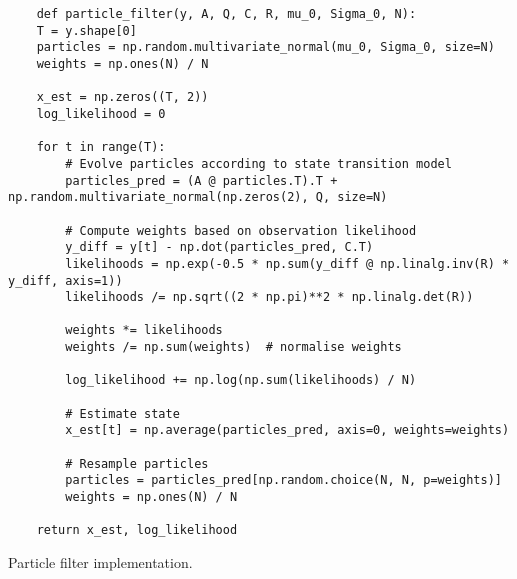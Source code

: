 \documentclass[12pt]{article}
\begin{document}
\begin{listing}
\begin{verbatim}
    def particle_filter(y, A, Q, C, R, mu_0, Sigma_0, N):
    T = y.shape[0]
    particles = np.random.multivariate_normal(mu_0, Sigma_0, size=N)
    weights = np.ones(N) / N

    x_est = np.zeros((T, 2))
    log_likelihood = 0

    for t in range(T):
        # Evolve particles according to state transition model
        particles_pred = (A @ particles.T).T + np.random.multivariate_normal(np.zeros(2), Q, size=N)

        # Compute weights based on observation likelihood
        y_diff = y[t] - np.dot(particles_pred, C.T)
        likelihoods = np.exp(-0.5 * np.sum(y_diff @ np.linalg.inv(R) * y_diff, axis=1))
        likelihoods /= np.sqrt((2 * np.pi)**2 * np.linalg.det(R))

        weights *= likelihoods
        weights /= np.sum(weights)  # normalise weights

        log_likelihood += np.log(np.sum(likelihoods) / N)

        # Estimate state
        x_est[t] = np.average(particles_pred, axis=0, weights=weights)

        # Resample particles
        particles = particles_pred[np.random.choice(N, N, p=weights)]
        weights = np.ones(N) / N

    return x_est, log_likelihood
\end{verbatim}
\caption{Particle filter implementation.}
\end{listing}
\end{document}
